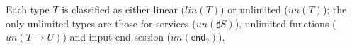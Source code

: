 \documentclass{easychair}
\newcommand{\key}{\mathsf}
\newcommand{\gvInput}[2]{\mathord{?}{#1}.{#2}}
\newcommand{\gvEndOutput}{\key{end}_!}
\newcommand{\gvEndInput}{\key{end}_?}
\newcommand{\gvService}[1]{\sharp {#1}}
\newcommand{\gvj}[3]{{#1} \vdash {#2} : {#3}}
\newcommand{\gvUnFun}[2]{{#1} \to {#2}}
\newcommand{\gvTimes}[2]{{#1} \otimes {#2}}
\newcommand{\gvLink}[2]{\key{link}~{#1}~{#2}}
\newcommand{\gvReceive}[1]{\key{receive}~{#1}}
\newcommand{\gvWith}[3]{\key{with}~{#1}~\key{connect}~{#2}~\key{to}~{#3}}
\newcommand{\gvTerminate}[1]{\key{terminate}~{#1}}
\newcommand{\gvSendType}[2]{\key{sendType}~{#1}~{#2}}
\newcommand{\gvReceiveType}[2]{\key{receiveType}~{#1}~{#2}}
\newcommand{\gvServeOld}[3]{\key{serve}~{#1}({#2})={#3}}
\newcommand{\gvServe}[2]{\key{serve}~{#1}.{#2}}
\newcommand{\gvRequest}[1]{\key{request}~{#1}}
\newcommand{\un}[1]{\mathit{un}(#1)}
\newcommand{\lin}[1]{\mathit{lin}(#1)}
\newcommand{\hgv}{HGV\xspace}
\begin{document}





Each type $T$ is classified as either linear ($\lin{T}$) or unlimited ($\un{T}$); the only unlimited
types are those for services ($\un{\gvService{S}}$), unlimited functions ($\un{\gvUnFun{T}{U}}$) and
input end session ($\un{\gvEndInput}$).
\end{document}
